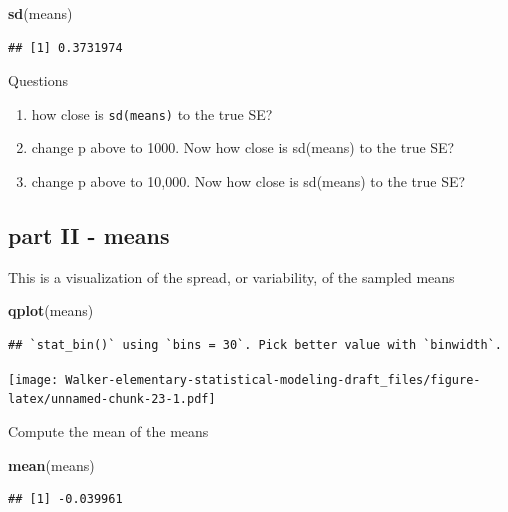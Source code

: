 \documentclass[]{book}
\newenvironment{Shaded}{\begin{snugshade}}{\end{snugshade}}
\newcommand{\KeywordTok}[1]{\textcolor[rgb]{0.13,0.29,0.53}{\textbf{#1}}}
\newcommand{\NormalTok}[1]{#1}
\providecommand{\tightlist}{%
  \setlength{\itemsep}{0pt}\setlength{\parskip}{0pt}}
\begin{document}
\begin{Shaded}
\begin{Highlighting}[]
\KeywordTok{sd}\NormalTok{(means)}
\end{Highlighting}
\end{Shaded}

\begin{verbatim}
## [1] 0.3731974
\end{verbatim}

Questions

\begin{enumerate}
\def\labelenumi{\arabic{enumi}.}
\tightlist
\item
  how close is \texttt{sd(means)} to the true SE?
\item
  change p above to 1000. Now how close is sd(means) to the true SE?
\item
  change p above to 10,000. Now how close is sd(means) to the true SE?
\end{enumerate}

\subsection{part II - means}\label{part-ii---means}

This is a visualization of the spread, or variability, of the sampled
means

\begin{Shaded}
\begin{Highlighting}[]
\KeywordTok{qplot}\NormalTok{(means)}
\end{Highlighting}
\end{Shaded}

\begin{verbatim}
## `stat_bin()` using `bins = 30`. Pick better value with `binwidth`.
\end{verbatim}

\texttt{[image: Walker-elementary-statistical-modeling-draft\_files/figure-latex/unnamed-chunk-23-1.pdf]}

Compute the mean of the means

\begin{Shaded}
\begin{Highlighting}[]
\KeywordTok{mean}\NormalTok{(means)}
\end{Highlighting}
\end{Shaded}

\begin{verbatim}
## [1] -0.039961
\end{verbatim}
\end{document}

